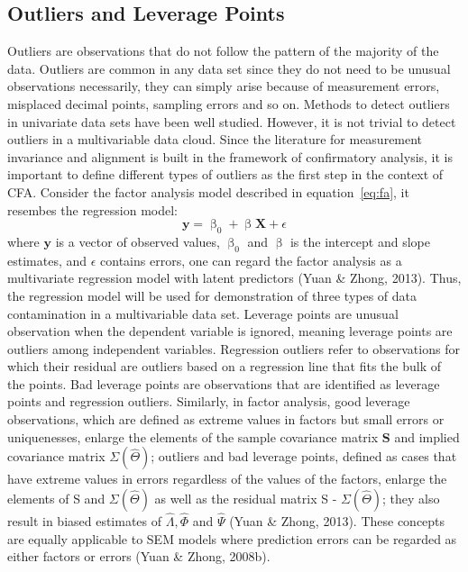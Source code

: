 \documentclass[
  man]{apa7}
\let\beta\upbeta
\begin{document}
\subsection{Outliers and Leverage Points}\label{outliers-and-leverage-points}

Outliers are observations that do not follow the pattern of the majority of the data. Outliers are common in any data set since they do not need to be unusual observations necessarily, they can simply arise because of measurement errors, misplaced decimal points, sampling errors and so on. Methods to detect outliers in univariate data sets have been well studied. However, it is not trivial to detect outliers in a multivariable data cloud. Since the literature for measurement invariance and alignment is built in the framework of confirmatory analysis, it is important to define different types of outliers as the first step in the context of CFA. Consider the factor analysis model described in equation~\eqref{eq:fa},
it resembes the regression model:
\begin{equation}
\textbf{y} = \beta_{0} + \beta\textbf{X} + \epsilon
\end{equation}
where \(\textbf{y}\) is a vector of observed values, \(\beta_{0}\) and \(\beta\) is the intercept and slope estimates, and \(\epsilon\) contains errors, one can regard the factor analysis as a multivariate regression model with latent predictors (Yuan \& Zhong, 2013). Thus, the regression model will be used for demonstration of three types of data contamination in a multivariable data set. Leverage points are unusual observation when the dependent variable is ignored, meaning leverage points are outliers among independent variables. Regression outliers refer to observations for
which their residual are outliers based on a regression line that fits the bulk of the points. Bad leverage points are observations that are identified as leverage points and regression outliers. Similarly, in factor analysis, good leverage observations, which are defined as extreme
values in factors but small errors or uniquenesses, enlarge the elements of the sample covariance matrix \(\textbf{S}\) and implied covariance matrix \(\Sigma(\hat{\Theta})\); outliers and bad leverage points, defined as cases that have extreme values in errors regardless
of the values of the factors, enlarge the elements of S and \(\Sigma(\hat{\Theta})\) as well as the residual matrix S - \(\Sigma(\hat{\Theta})\); they also result in biased estimates of \(\hat{\Lambda}, \hat{\Phi}\) and \(\hat{\Psi}\) (Yuan \& Zhong, 2013). These concepts are equally applicable to SEM models where prediction errors can be regarded as either factors or errors (Yuan \& Zhong, 2008b).
\end{document}
